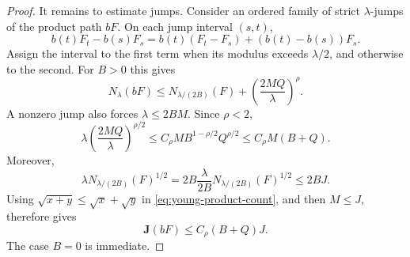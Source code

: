 \documentclass[11pt]{article}
\numberwithin{equation}{section}
\theoremstyle{remark}
\theoremstyle{definition}
\begin{document}
\begin{proof}
It remains to estimate jumps.  Consider an ordered family of strict
$\lambda$-jumps of the product path $bF$.  On each jump interval $(s,t)$,
\[
 b(t)F_t-b(s)F_s
 =b(t)(F_t-F_s)+(b(t)-b(s))F_s.
\]
Assign the interval to the first term when its modulus exceeds
$\lambda/2$, and otherwise to the second.  For $B>0$ this gives
\begin{equation}\label{eq:young-product-count}
 N_\lambda(bF)
 \le N_{\lambda/(2B)}(F)
 +\left(\frac{2MQ}{\lambda}\right)^\rho.
\end{equation}
A nonzero jump also forces $\lambda\le2BM$.  Since $\rho<2$,
\[
 \lambda\left(\frac{2MQ}{\lambda}\right)^{\rho/2}
 \le C_\rho M B^{1-\rho/2}Q^{\rho/2}
 \le C_\rho M(B+Q).
\]
Moreover,
\[
 \lambda N_{\lambda/(2B)}(F)^{1/2}
 =2B\frac{\lambda}{2B}N_{\lambda/(2B)}(F)^{1/2}
 \le2BJ.
\]
Using $\sqrt{x+y}\le\sqrt x+\sqrt y$ in
\eqref{eq:young-product-count}, and then $M\le J$, therefore gives
\begin{equation}\label{eq:young-product-jump}
 \mathbf J(bF)\le C_\rho(B+Q)J.
\end{equation}
The case $B=0$ is immediate.


\end{proof}
\end{document}
